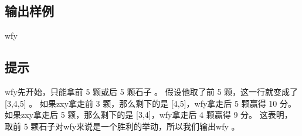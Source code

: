 \documentclass[12pt, a4paper]{article}
\begin{document}
\subsection*{输出样例}
wfy\newline

 \subsection*{提示}
wfy先开始，只能拿前 5 颗或后 5 颗石子 。\newline
假设他取了前 5 颗，这一行就变成了 [3,4,5] 。\newline
如果zxy拿走前 3 颗，那么剩下的是 [4,5]，wfy拿走后 5 颗赢得 10 分。\newline
如果zxy拿走后 5 颗，那么剩下的是 [3,4]，wfy拿走后 4 颗赢得 9 分。\newline
这表明，取前 5 颗石子对wfy来说是一个胜利的举动，所以我们输出wfy 。
\end{document}
